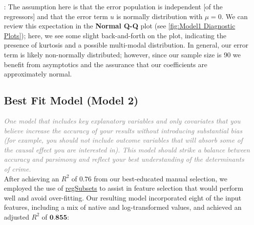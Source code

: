 \begin{description}[font=$\bullet$~\normalfont\scshape\small\color{red!50!black}]
	\item [CLM 6 - Normality] {\fontsize{10}{10} \selectfont : The assumption here is that the error population is independent [of the regressors] and that the error term $u$ is normally distribution with $\mu = 0$.  We can review this expectation in the \textbf{Normal Q-Q} plot (see \ref{fig:Model1 Diagnostic Plots}); here, we see some slight back-and-forth on the plot, indicating the presence of kurtosis and a possible multi-modal distribution.  In general, our error term is likely non-normally distributed; however, since our sample size is 90 we benefit from asymptotics and the assurance that our coefficients are approximately normal.}
\end{description}

\pagebreak

\subsection{Best Fit Model (Model 2)}
\label{sec:Model2}

\textit{\textcolor{Grey}{One model that includes key explanatory variables and only covariates that you believe increase the accuracy of your results without introducing substantial bias (for example, you should not include outcome variables that will absorb some of the causal effect you are interested in). This model should strike a balance between accuracy and parsimony and reflect your best understanding of the determinants of crime.}}\\

After achieving an $R^2$ of $0.76$ from our best-educated manual selection, we employed the use of \href{https://www.rdocumentation.org/packages/leaps/versions/2.1-1/topics/regsubsets}{regSubsets} to assist in feature selection that would perform well and avoid over-fitting.  Our resulting model incorporated eight of the input features, including a mix of native and log-transformed values, and achieved an adjusted $R^2$ of $\textbf{0.855}$:\\



